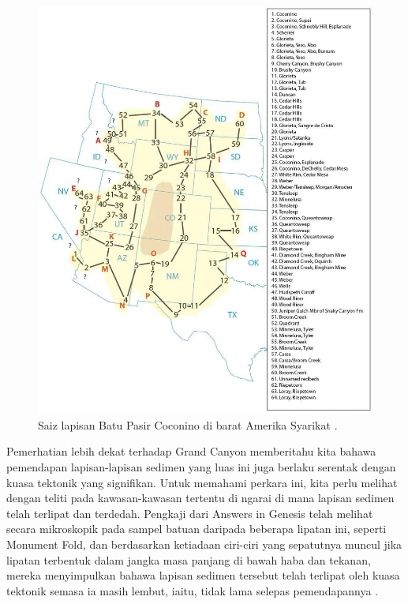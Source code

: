 \documentclass[10pt,twocolumn,letterpaper]{article}
\begin{document}
\begin{figure}[t]
\begin{center}
   \includegraphics[width=1\linewidth]{coconino.jpg}
\end{center}
   \caption{Saiz lapisan Batu Pasir Coconino di barat Amerika Syarikat \cite{21}.}
\label{fig:3}
\label{fig:onecol}
\end{figure}

Pemerhatian lebih dekat terhadap Grand Canyon memberitahu kita bahawa pemendapan lapisan-lapisan sedimen yang luas ini juga berlaku serentak dengan kuasa tektonik yang signifikan. Untuk memahami perkara ini, kita perlu melihat dengan teliti pada kawasan-kawasan tertentu di ngarai di mana lapisan sedimen telah terlipat dan terdedah. Pengkaji dari Answers in Genesis \cite{42} telah melihat secara mikroskopik pada sampel batuan daripada beberapa lipatan ini, seperti Monument Fold, dan berdasarkan ketiadaan ciri-ciri yang sepatutnya muncul jika lipatan terbentuk dalam jangka masa panjang di bawah haba dan tekanan, mereka menyimpulkan bahawa lapisan sedimen tersebut telah terlipat oleh kuasa tektonik semasa ia masih lembut, iaitu, tidak lama selepas pemendapannya \cite{43}.
\end{document}
